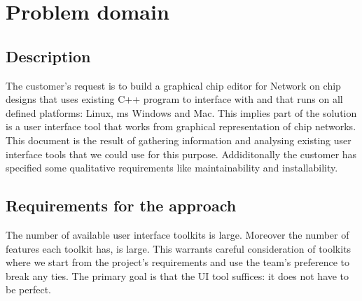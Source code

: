\section{Problem domain}
\subsection{Description}

The customer's request is to build a graphical chip editor for Network on chip
designs that uses existing C++ program to interface with and that runs on all
defined platforms: Linux, ms Windows and Mac. This implies part of the solution
is a user interface tool that works from graphical representation of chip
networks. This document is the result of gathering information and analysing
existing user interface tools that we could use for this purpose. Addiditonally
the customer has specified some qualitative requirements like maintainability
and installability.

\subsection{Requirements for the approach}

The number of available user interface toolkits is large.  Moreover the number
of features each toolkit has, is large. This warrants careful consideration of
toolkits where we start from the project's requirements and use the team's
preference to break any ties.  The primary goal is that the UI tool suffices:
it does not have to be perfect.
